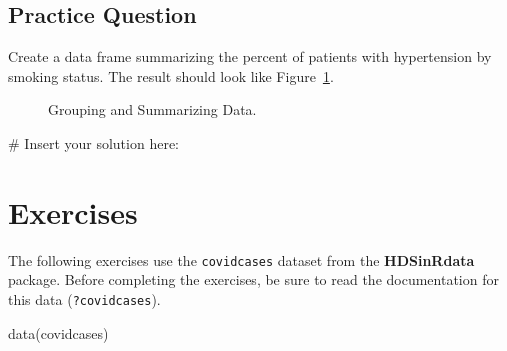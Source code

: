 \documentclass[
  letterpaper,
]{krantz}
\makeatletter
\newenvironment{Shaded}{\begin{snugshade}}{\end{snugshade}}
\newcommand{\CommentTok}[1]{\textcolor[rgb]{0.37,0.37,0.37}{#1}}
\newcommand{\FunctionTok}[1]{\textcolor[rgb]{0.28,0.35,0.67}{#1}}
\newcommand{\NormalTok}[1]{\textcolor[rgb]{0.00,0.23,0.31}{#1}}
\newenvironment{kframe}{%
\medskip{}
\setlength{\fboxsep}{.8em}
 \def\at@end@of@kframe{}%
 \ifinner\ifhmode%
  \def\at@end@of@kframe{\end{minipage}}%
  \begin{minipage}{\columnwidth}%
 \fi\fi%
 \def\FrameCommand##1{\hskip\@totalleftmargin \hskip-\fboxsep
 \colorbox{shadecolor}{##1}\hskip-\fboxsep
     \hskip-\linewidth \hskip-\@totalleftmargin \hskip\columnwidth}%
 \MakeFramed {\advance\hsize-\width
   \@totalleftmargin\z@ \linewidth\hsize
   \@setminipage}}%
 {\par\unskip\endMakeFramed%
 \at@end@of@kframe}
\renewenvironment{Shaded}{\begin{kframe}}{\end{kframe}}
\makeatother
\begin{document}
\subsection{Practice Question}\label{practice-question-10}

Create a data frame summarizing the percent of patients with
hypertension by smoking status. The result should look like
Figure~\ref{fig-grouping-and-summarizing}.

\begin{figure}


\caption{\label{fig-grouping-and-summarizing}Grouping and Summarizing
Data.}

\end{figure}%

\begin{Shaded}
\begin{Highlighting}[]
\CommentTok{\# Insert your solution here:}
\end{Highlighting}
\end{Shaded}

\section{Exercises}\label{exercises-3}

The following exercises use the \texttt{covidcases} dataset from the
\textbf{HDSinRdata} package. Before completing the exercises, be sure to
read the documentation for this data (\texttt{?covidcases}).

\begin{Shaded}
\begin{Highlighting}[]
\FunctionTok{data}\NormalTok{(covidcases)}
\end{Highlighting}
\end{Shaded}
\end{document}
